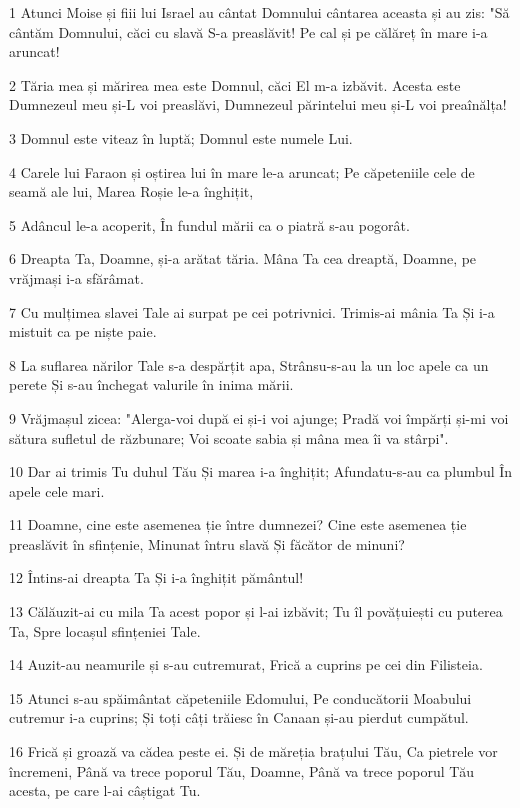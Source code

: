 \par 1 Atunci Moise și fiii lui Israel au cântat Domnului cântarea aceasta și au zis: "Să cântăm Domnului, căci cu slavă S-a preaslăvit! Pe cal și pe călăreț în mare i-a aruncat!
\par 2 Tăria mea și mărirea mea este Domnul, căci El m-a izbăvit. Acesta este Dumnezeul meu și-L voi preaslăvi, Dumnezeul părintelui meu și-L voi preaînălța!
\par 3 Domnul este viteaz în luptă; Domnul este numele Lui.
\par 4 Carele lui Faraon și oștirea lui în mare le-a aruncat; Pe căpeteniile cele de seamă ale lui, Marea Roșie le-a înghițit,
\par 5 Adâncul le-a acoperit, În fundul mării ca o piatră s-au pogorât.
\par 6 Dreapta Ta, Doamne, și-a arătat tăria. Mâna Ta cea dreaptă, Doamne, pe vrăjmași i-a sfărâmat.
\par 7 Cu mulțimea slavei Tale ai surpat pe cei potrivnici. Trimis-ai mânia Ta Și i-a mistuit ca pe niște paie.
\par 8 La suflarea nărilor Tale s-a despărțit apa, Strânsu-s-au la un loc apele ca un perete Și s-au închegat valurile în inima mării.
\par 9 Vrăjmașul zicea: "Alerga-voi după ei și-i voi ajunge; Pradă voi împărți și-mi voi sătura sufletul de răzbunare; Voi scoate sabia și mâna mea îi va stârpi".
\par 10 Dar ai trimis Tu duhul Tău Și marea i-a înghițit; Afundatu-s-au ca plumbul În apele cele mari.
\par 11 Doamne, cine este asemenea ție între dumnezei? Cine este asemenea ție preaslăvit în sfințenie, Minunat întru slavă Și făcător de minuni?
\par 12 Întins-ai dreapta Ta Și i-a înghițit pământul!
\par 13 Călăuzit-ai cu mila Ta acest popor și l-ai izbăvit; Tu îl povățuiești cu puterea Ta, Spre locașul sfințeniei Tale.
\par 14 Auzit-au neamurile și s-au cutremurat, Frică a cuprins pe cei din Filisteia.
\par 15 Atunci s-au spăimântat căpeteniile Edomului, Pe conducătorii Moabului cutremur i-a cuprins; Și toți câți trăiesc în Canaan și-au pierdut cumpătul.
\par 16 Frică și groază va cădea peste ei. Și de măreția brațului Tău, Ca pietrele vor încremeni, Până va trece poporul Tău, Doamne, Până va trece poporul Tău acesta, pe care l-ai câștigat Tu.
